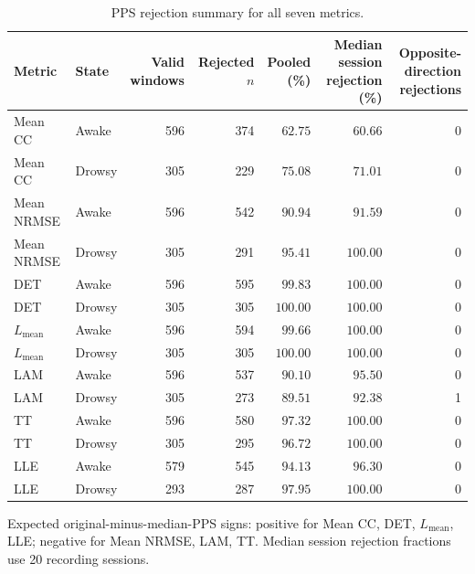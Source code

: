 \documentclass[conference,a4paper]{IEEEtran}
\begin{document}
\begin{table}[!tbp]
\centering
\caption{PPS rejection summary for all seven metrics.}
\label{tab:supp_pps}
\footnotesize
\setlength{\tabcolsep}{3pt}
\renewcommand{\arraystretch}{1.05}
\begin{tabular*}{\linewidth}{@{\extracolsep{\fill}}llrrrrr@{}}
\toprule
Metric &
State &
\makecell{Valid\\windows} &
\makecell{Rejected\\$n$} &
\makecell{Pooled\\(\%)} &
\makecell{Median session\\rejection (\%)} &
\makecell{Opposite-direction\\rejections}\\
\midrule
Mean CC    & Awake  & 596 & 374 & $62.75$  & $60.66$  & 0\\
Mean CC    & Drowsy & 305 & 229 & $75.08$  & $71.01$  & 0\\
Mean NRMSE & Awake  & 596 & 542 & $90.94$  & $91.59$  & 0\\
Mean NRMSE & Drowsy & 305 & 291 & $95.41$  & $100.00$ & 0\\
DET        & Awake  & 596 & 595 & $99.83$  & $100.00$ & 0\\
DET        & Drowsy & 305 & 305 & $100.00$ & $100.00$ & 0\\
$L_{\mathrm{mean}}$ & Awake  & 596 & 594 & $99.66$  & $100.00$ & 0\\
$L_{\mathrm{mean}}$ & Drowsy & 305 & 305 & $100.00$ & $100.00$ & 0\\
LAM        & Awake  & 596 & 537 & $90.10$  & $95.50$  & 0\\
LAM        & Drowsy & 305 & 273 & $89.51$  & $92.38$  & 1\\
TT         & Awake  & 596 & 580 & $97.32$  & $100.00$ & 0\\
TT         & Drowsy & 305 & 295 & $96.72$  & $100.00$ & 0\\
LLE        & Awake  & 579 & 545 & $94.13$  & $96.30$  & 0\\
LLE        & Drowsy & 293 & 287 & $97.95$  & $100.00$ & 0\\
\bottomrule
\end{tabular*}

\par\smallskip
\raggedright
Expected original-minus-median-PPS signs: positive for Mean CC, DET, $L_{\mathrm{mean}}$, LLE; negative for Mean NRMSE, LAM, TT. Median session rejection fractions use 20 recording sessions.
\end{table}
\end{document}
